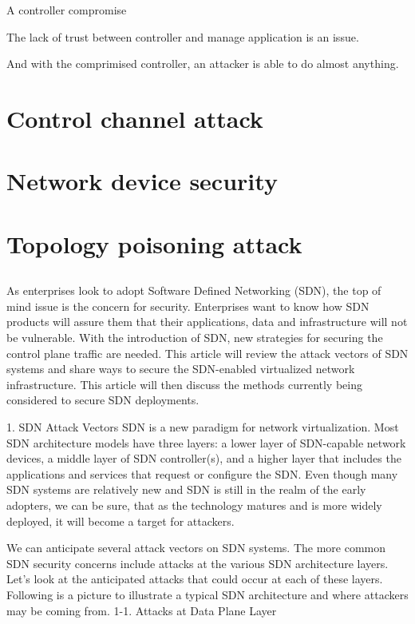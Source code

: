 A controller compromise 

The lack of trust between controller and manage application is an issue.  

And with the comprimised controller, an attacker is able to do almost anything.

\section{Control channel attack}
\section{Network device security}
\section{Topology poisoning attack}

\subsection{}

As enterprises look to adopt Software Defined Networking (SDN), the top of mind issue is the concern for security. Enterprises want to know how SDN products will assure them that their applications, data and infrastructure will not be vulnerable. With the introduction of SDN, new strategies for securing the control plane traffic are needed. This article will review the attack vectors of SDN systems and share ways to secure the SDN-enabled virtualized network infrastructure. This article will then discuss the methods currently being considered to secure SDN deployments.

1. SDN Attack Vectors
  SDN is a new paradigm for network virtualization.  Most SDN architecture models have three layers: a lower layer of SDN-capable network devices, a middle layer of SDN controller(s), and a higher layer that includes the applications and services that request or configure the SDN.  Even though many SDN systems are relatively new and SDN is still in the realm of the early adopters, we can be sure, that as the technology matures and is more widely deployed, it will become a target for attackers.

We can anticipate several attack vectors on SDN systems.  The more common SDN security concerns include attacks at the various SDN architecture layers.  Let’s look at the anticipated attacks that could occur at each of these layers.  Following is a picture to illustrate a typical SDN architecture and where attackers may be coming from.
1-1. Attacks at Data Plane Layer

